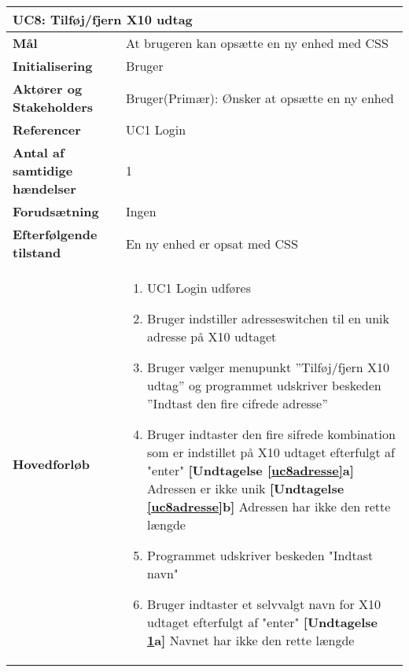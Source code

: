 \begin{table}[H] \centering
\begin{tabular}{|p{6cm}|p{8cm}|}
	\hline
		\multicolumn{2}{|l|}{\textbf{UC8: Tilføj/fjern X10 udtag}} \\\hline
		
		\textbf{Mål}							&At brugeren kan opsætte en ny enhed med CSS						\\\hline
		\textbf{Initialisering}				&Bruger					 										\\\hline
		\textbf{Aktører og Stakeholders}		&Bruger(Primær): Ønsker at opsætte en ny enhed						\\\hline
		\textbf{Referencer}					&UC1 Login														\\\hline
		\textbf{Antal af samtidige hændelser}&1 																\\\hline
		\textbf{Forudsætning}				&Ingen															\\\hline
		\textbf{Efterfølgende tilstand}		&En ny enhed er opsat med CSS									\\\hline
		\textbf{Hovedforløb}					
			&\begin{enumerate}

				\item UC1 Login udføres
				
				\item \label{uc8indstilAdresse} Bruger indstiller adresseswitchen til en unik adresse på X10 udtaget
				
				\item Bruger vælger menupunkt ''Tilføj/fjern X10 udtag'' og programmet udskriver beskeden ''Indtast den fire cifrede adresse''
				
				\item \label{uc8adresse} Bruger indtaster den fire sifrede kombination som er indstillet på X10 udtaget efterfulgt af "enter"\newline
						\textbf{[Undtagelse \ref{uc8adresse}a]} Adressen er ikke unik\newline
						\textbf{[Undtagelse \ref{uc8adresse}b]} Adressen har ikke den rette længde
				
				\item \label{uc8indstilNavn} Programmet udskriver beskeden "Indtast navn"
				
				\item \label{uc8navn} Bruger indtaster et selvvalgt navn for X10 udtaget efterfulgt af "enter"\newline
						\textbf{[Undtagelse \ref{uc8navn}a]} Navnet har ikke den rette længde
				

\end{enumerate}
\end{tabular}
\end{table}
